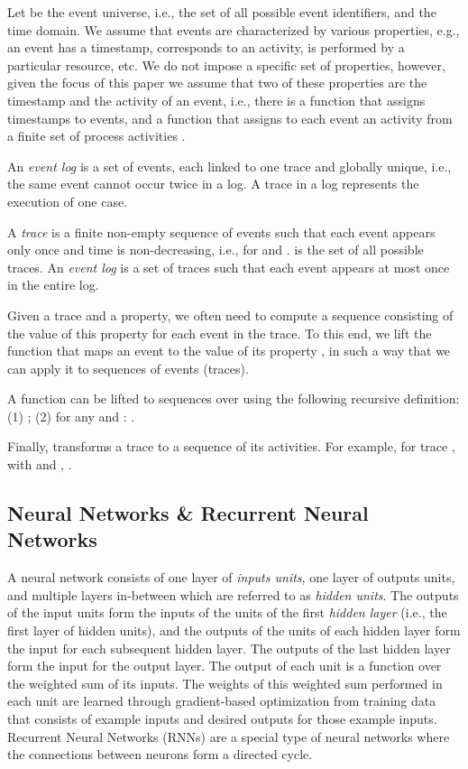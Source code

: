 \documentclass[runningheads,a4paper]{llncs}
\begin{document}
Let  be the event universe, i.e., the set of all possible event identifiers, and  the time domain. We assume that events are characterized by various properties, e.g., an event has a timestamp, corresponds to an activity, is performed by a particular resource, etc. We do not impose a specific set of properties, however, given the focus of this paper we assume that two of these properties are the timestamp and the activity of an event, i.e., there is a function  that assigns timestamps to events, and a function  that assigns to each event an activity from a finite set of process activities .

An \emph{event log} is a set of events, each linked to one trace and globally unique, i.e., the same event cannot occur twice in a log. A trace in a log represents the execution of one case.

\begin{definition}
	A \emph{trace} is a finite non-empty sequence of events  such that each event appears only once and time is non-decreasing, i.e., for  and .  is the set of all possible traces. An \emph{event log} is a set of traces  such that each event appears at most once in the entire log.
\end{definition}

Given a trace and a property, we often need to compute a sequence consisting of the value of this property for each event in the trace. To this end, we lift the function  that maps an event to the value of its property , in such a way that we can apply it to sequences of events (traces).



\begin{definition}
	\label{def:funtoseq}
	A function  can be lifted to sequences over  using the following recursive definition: (1) ;  (2) for any  and : .

\end{definition}

Finally,  transforms a trace  to a sequence of its activities. For example, for trace , with  and , .

\subsection{Neural Networks \& Recurrent Neural Networks}
A neural network consists of one layer of \emph{inputs units}, one layer of outputs units, and multiple layers in-between which are referred to as \emph{hidden units}. The outputs of the input units form the inputs of the units of the first \emph{hidden layer} (i.e., the first layer of hidden units), and the outputs of the units of each hidden layer form the input for each subsequent hidden layer. The outputs of the last hidden layer form the input for the output layer. The output of each unit is a function over the weighted sum of its inputs. The weights of this weighted sum performed in each unit are learned through gradient-based optimization from training data that consists of example inputs and desired outputs for those example inputs. Recurrent Neural Networks (RNNs) are a special type of neural networks where the connections between neurons form a directed cycle.
\end{document}
